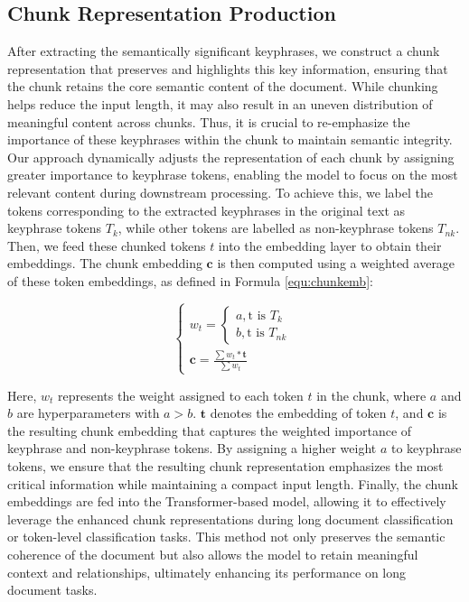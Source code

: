 \documentclass[11pt]{article}
\begin{document}
\subsection{Chunk Representation Production}

After extracting the semantically significant keyphrases, we construct a chunk representation that preserves and highlights this key information, ensuring that the chunk retains the core semantic content of the document. While chunking helps reduce the input length, it may also result in an uneven distribution of meaningful content across chunks. Thus, it is crucial to re-emphasize the importance of these keyphrases within the chunk to maintain semantic integrity. Our approach dynamically adjusts the representation of each chunk by assigning greater importance to keyphrase tokens, enabling the model to focus on the most relevant content during downstream processing.
To achieve this, we label the tokens corresponding to the extracted keyphrases in the original text as keyphrase tokens $T_k$, while other tokens are labelled as non-keyphrase tokens $T_{nk}$. Then, we feed these chunked tokens $t$ into the embedding layer to obtain their embeddings. The chunk embedding $\boldsymbol{c}$ is then computed using a weighted average of these token embeddings, as defined in Formula \ref{equ:chunkemb}:



\begin{equation}
    \begin{cases}
        w_t = \begin{cases}
        a, \text{t is $T_k$}\\b, \text{t is $T_{nk}$}
        \end{cases} \\ 
       \boldsymbol{c} = \frac{\sum{w_t*\boldsymbol{t}}}{\sum{w_t}}
    \end{cases}
    \label{equ:chunkemb}
\end{equation}



Here, $w_t$ represents the weight assigned to each token $t$ in the chunk, where $a$ and $b$ are hyperparameters with $a > b.$
$\boldsymbol{t}$ denotes the embedding of token $t$, and $\boldsymbol{c}$ is the resulting chunk embedding that captures the weighted importance of keyphrase and non-keyphrase tokens. By assigning a higher weight $a$ to keyphrase tokens, we ensure that the resulting chunk representation emphasizes the most critical information while maintaining a compact input length.
Finally, the chunk embeddings are fed into the Transformer-based model, allowing it to effectively leverage the enhanced chunk representations during long document classification or token-level classification tasks. This method not only preserves the semantic coherence of the document but also allows the model to retain meaningful context and relationships, ultimately enhancing its performance on long document tasks.
\end{document}
